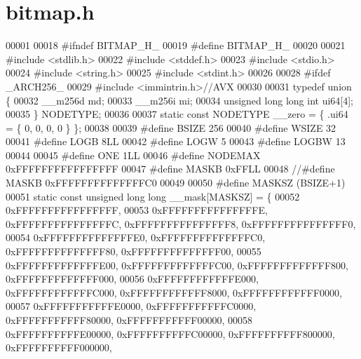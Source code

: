 \section{bitmap.\+h}
\label{summary_2bitmap_8h_source}

\begin{DoxyCode}
00001 
00018 \textcolor{preprocessor}{#ifndef BITMAP\_H\_}
00019 \textcolor{preprocessor}{#define BITMAP\_H\_}
00020 
00021 \textcolor{preprocessor}{#include <stdlib.h>}
00022 \textcolor{preprocessor}{#include <stddef.h>}
00023 \textcolor{preprocessor}{#include <stdio.h>}
00024 \textcolor{preprocessor}{#include <string.h>}
00025 \textcolor{preprocessor}{#include <stdint.h>}
00026 
00028 \textcolor{preprocessor}{#ifdef \_ARCH256\_}
00029 \textcolor{preprocessor}{#include <immintrin.h>}\textcolor{comment}{//AVX}
00030 
00031 \textcolor{keyword}{typedef} \textcolor{keyword}{union }\{
00032     \_\_m256d md;
00033     \_\_m256i mi;
00034     \textcolor{keywordtype}{unsigned} \textcolor{keywordtype}{long} \textcolor{keywordtype}{long} \textcolor{keywordtype}{int} ui64[4];
00035 \} NODETYPE; 
00036 
00037 \textcolor{keyword}{static} \textcolor{keyword}{const} NODETYPE \_\_zero = \{ .ui64 = \{ 0, 0, 0, 0 \} \};
00038 
00039 \textcolor{preprocessor}{#define BSIZE 256}
00040 \textcolor{preprocessor}{#define WSIZE 32}
00041 \textcolor{preprocessor}{#define LOGB 8LL}
00042 \textcolor{preprocessor}{#define LOGW 5}
00043 \textcolor{preprocessor}{#define LOGBW 13}
00044 
00045 \textcolor{preprocessor}{#define ONE 1LL}
00046 \textcolor{preprocessor}{#define NODEMAX 0xFFFFFFFFFFFFFFFF}
00047 \textcolor{preprocessor}{#define MASKB 0xFFLL}
00048 \textcolor{comment}{//#define MASKB 0xFFFFFFFFFFFFFFC0}
00049 
00050 \textcolor{preprocessor}{#define MASKSZ (BSIZE+1)}
00051 \textcolor{keyword}{static} \textcolor{keyword}{const} \textcolor{keywordtype}{unsigned} \textcolor{keywordtype}{long} \textcolor{keywordtype}{long} \_\_mask[MASKSZ] = \{
00052         0xFFFFFFFFFFFFFFFF,
00053         0xFFFFFFFFFFFFFFFE, 0xFFFFFFFFFFFFFFFC, 0xFFFFFFFFFFFFFFF8, 0xFFFFFFFFFFFFFFF0,
00054         0xFFFFFFFFFFFFFFE0, 0xFFFFFFFFFFFFFFC0, 0xFFFFFFFFFFFFFF80, 0xFFFFFFFFFFFFFF00,
00055         0xFFFFFFFFFFFFFE00, 0xFFFFFFFFFFFFFC00, 0xFFFFFFFFFFFFF800, 0xFFFFFFFFFFFFF000,
00056         0xFFFFFFFFFFFFE000, 0xFFFFFFFFFFFFC000, 0xFFFFFFFFFFFF8000, 0xFFFFFFFFFFFF0000,
00057         0xFFFFFFFFFFFE0000, 0xFFFFFFFFFFFC0000, 0xFFFFFFFFFFF80000, 0xFFFFFFFFFFF00000,
00058         0xFFFFFFFFFFE00000, 0xFFFFFFFFFFC00000, 0xFFFFFFFFFF800000, 0xFFFFFFFFFF000000,

\end{DoxyCode}
